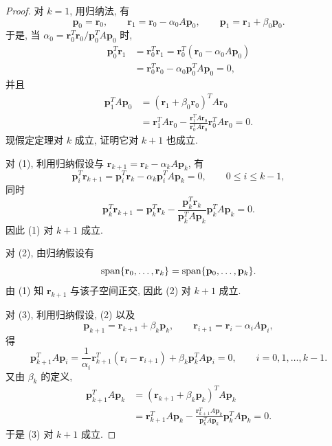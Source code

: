 \begin{proof}
对 $k=1$, 用归纳法, 有
\[
  \mathbf{p}_0=\mathbf{r}_0,\qquad
  \mathbf{r}_1=\mathbf{r}_0-\alpha_0A\mathbf{p}_0,\qquad
  \mathbf{p}_1=\mathbf{r}_1+\beta_0\mathbf{p}_0.
\]
于是, 当 $\alpha_0=\mathbf{r}_0^T\mathbf{r}_0/\mathbf{p}_0^TA\mathbf{p}_0$ 时,
\[
  \begin{aligned}
    \mathbf{p}_0^T\mathbf{r}_1&=\mathbf{r}_0^T\mathbf{r}_1
    =\mathbf{r}_0^T(\mathbf{r}_0-\alpha_0A\mathbf{p}_0)\\
    &=\mathbf{r}_0^T\mathbf{r}_0-\alpha_0\mathbf{p}_0^TA\mathbf{p}_0=0,
  \end{aligned}
\]
并且
\[
  \begin{aligned}
    \mathbf{p}_1^TA\mathbf{p}_0
    &=(\mathbf{r}_1+\beta_0\mathbf{r}_0)^TA\mathbf{r}_0\\
    &=\mathbf{r}_1^TA\mathbf{r}_0
      -\frac{\mathbf{r}_1^TA\mathbf{r}_0}{\mathbf{r}_0^TA\mathbf{r}_0}
      \mathbf{r}_0^TA\mathbf{r}_0=0.
  \end{aligned}
\]
现假定定理对 $k$ 成立, 证明它对 $k+1$ 也成立.

对 (1), 利用归纳假设与 $\mathbf{r}_{k+1}=\mathbf{r}_k-\alpha_kA\mathbf{p}_k$, 有
\[
  \mathbf{p}_i^T\mathbf{r}_{k+1}
  =\mathbf{p}_i^T\mathbf{r}_k-\alpha_k\mathbf{p}_i^TA\mathbf{p}_k=0,
  \qquad 0\leqslant i\leqslant k-1,
\]
同时
\[
  \mathbf{p}_k^T\mathbf{r}_{k+1}
  =\mathbf{p}_k^T\mathbf{r}_k
  -\frac{\mathbf{p}_k^T\mathbf{r}_k}{\mathbf{p}_k^TA\mathbf{p}_k}
  \mathbf{p}_k^TA\mathbf{p}_k=0.
\]
因此 (1) 对 $k+1$ 成立.

对 (2), 由归纳假设有
\[
  \operatorname{span}\{\mathbf{r}_0,\ldots,\mathbf{r}_k\}
  =\operatorname{span}\{\mathbf{p}_0,\ldots,\mathbf{p}_k\}.
\]
由 (1) 知 $\mathbf{r}_{k+1}$ 与该子空间正交, 因此 (2) 对 $k+1$ 成立.

对 (3), 利用归纳假设, (2) 以及
\[
  \mathbf{p}_{k+1}=\mathbf{r}_{k+1}+\beta_k\mathbf{p}_k,
  \qquad
  \mathbf{r}_{i+1}=\mathbf{r}_i-\alpha_iA\mathbf{p}_i,
\]
得
\[
  \mathbf{p}_{k+1}^TA\mathbf{p}_i
  =\frac{1}{\alpha_i}\mathbf{r}_{k+1}^T(\mathbf{r}_i-\mathbf{r}_{i+1})
  +\beta_k\mathbf{p}_k^TA\mathbf{p}_i=0,
  \qquad i=0,1,\ldots,k-1.
\]
又由 $\beta_k$ 的定义,
\[
  \begin{aligned}
    \mathbf{p}_{k+1}^TA\mathbf{p}_k
    &=(\mathbf{r}_{k+1}+\beta_k\mathbf{p}_k)^TA\mathbf{p}_k\\
    &=\mathbf{r}_{k+1}^TA\mathbf{p}_k
      -\frac{\mathbf{r}_{k+1}^TA\mathbf{p}_k}{\mathbf{p}_k^TA\mathbf{p}_k}
      \mathbf{p}_k^TA\mathbf{p}_k=0.
  \end{aligned}
\]
于是 (3) 对 $k+1$ 成立.


\end{proof}
